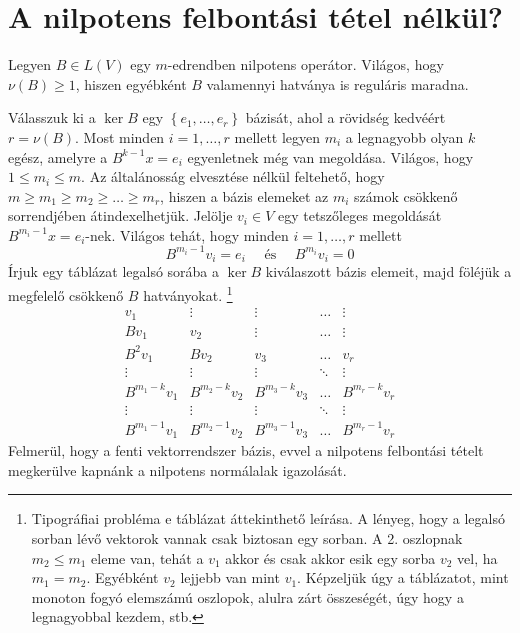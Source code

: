 \documentclass[a4paper, showtrims]{memoir}
\theoremstyle{plain}
\theoremstyle{remark}
\theoremstyle{definition}
\begin{document}
\section{A nilpotens felbontási tétel nélkül?}
Legyen $B\in L\left( V \right)$ egy $m$-edrendben nilpotens operátor.
Világos, hogy $\nu\left( B \right)\geq 1$,
hiszen egyébként $B$ valamennyi hatványa is reguláris maradna.

Válasszuk ki a $\ker B$ egy
$\left\{ e_1,\ldots,e_r \right\}$ bázisát,
ahol a rövidség kedvéért $r=\nu\left( B \right)$.
Most minden $i=1,\ldots,r$ mellett legyen $m_i$ a legnagyobb olyan $k$ egész, amelyre a
$B^{k-1}x=e_i$ egyenletnek még van megoldása.
Világos, hogy $1\leq m_i\leq m$.
Az általánosság elvesztése nélkül feltehető, hogy
$m\geq m_1\geq m_2\geq \dots \geq m_r$, hiszen a bázis elemeket az $m_i$ számok
csökkenő sorrendjében átindexelhetjük.
Jelölje $v_i\in V$ egy tetszőleges megoldását $B^{m_i-1}x=e_i$-nek.
Világos tehát, hogy minden $i=1,\ldots,r$ mellett
\[
	B^{m_i-1}v_i=e_i \quad\text{ és }\quad B^{m_i}v_i=0
\]
Írjuk egy táblázat legalsó sorába a $\ker B$ kiválaszott bázis elemeit,
majd föléjük a megfelelő csökkenő $B$ hatványokat.%
\footnote{Tipográfiai probléma e táblázat áttekinthető leírása.
	A lényeg, hogy a legalsó sorban lévő vektorok vannak csak biztosan egy sorban. A 2. oszlopnak $m_2\leq m_1$
	eleme van, tehát a $v_1$ akkor és csak akkor esik egy sorba $v_2$ vel, ha $m_1=m_2$. Egyébként $v_2$ lejjebb van mint $v_1$. Képzeljük úgy a táblázatot, mint monoton fogyó elemszámú oszlopok, alulra zárt összeségét, úgy hogy a legnagyobbal kezdem, stb.}
\[
	\begin{matrix}
		v_1          & \vdots       & \vdots       & \dots  & \vdots       \\
		Bv_1         & v_2          & \vdots       & \dots  & \vdots       \\
		B^2v_1       & Bv_2         & v_3          & \dots  & v_r          \\
		\vdots       & \vdots       & \vdots       & \ddots & \vdots       \\
		B^{m_1-k}v_1 & B^{m_2-k}v_2 & B^{m_3-k}v_3 & \dots  & B^{m_r-k}v_r \\
		\vdots       & \vdots       & \vdots       & \ddots & \vdots       \\
		B^{m_1-1}v_1 & B^{m_2-1}v_2 & B^{m_3-1}v_3 & \dots  & B^{m_r-1}v_r
	\end{matrix}
\]
Felmerül, hogy a fenti vektorrendszer bázis, evvel a nilpotens felbontási tételt megkerülve
kapnánk a nilpotens normálalak igazolását.
\end{document}
